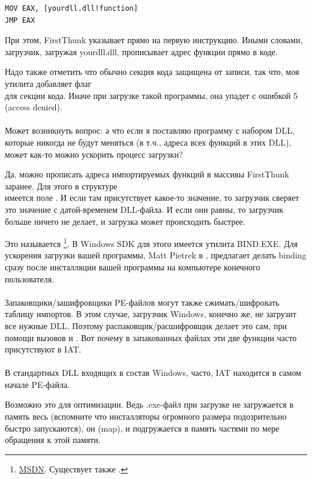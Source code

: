 \begin{lstlisting}
MOV EAX, [yourdll.dll!function]
JMP EAX
\end{lstlisting}

При этом, FirstThunk указывает прямо на первую инструкцию.
Иными словами, загрузчик, загружая yourdll.dll, прописывает адрес функции  прямо в коде.

Надо также отметить что обычно секция кода защищена от записи, так что, моя утилита добавляет флаг \\
для секции кода. Иначе при загрузке такой программы, она упадет с ошибкой 5 (access denied). \\
\\
Может возникнуть вопрос: а что если я поставляю программу с набором DLL,
которые никогда не будут меняться (в т.ч., адреса всех функций в этих DLL), может как-то можно ускорить процесс загрузки?

Да, можно прописать адреса импортируемых функций в массивы FirstThunk заранее.
Для этого в структуре \\
 имеется поле .
И если там присутствует какое-то значение, то загрузчик сверяет это значение с датой-временем DLL-файла.
И если они равны, то загрузчик больше ничего не делает, и загрузка может происходить быстрее.

Это называется 
\footnote{\href{http://go.yurichev.com/17050}{MSDN}.
Существует также .}.
В Windows SDK для этого имеется утилита BIND.EXE.
Для ускорения загрузки вашей программы, 
Matt Pietrek в \cite{Pietrek1}, предлагает делать binding сразу после инсталляции
вашей программы на компьютере конечного пользователя. \\
\\
Запаковщики/зашифровщики PE-файлов могут также сжимать/шифровать таблицу импортов.
В этом случае, загрузчик Windows, конечно же, не загрузит все нужные DLL.
Поэтому распаковщик/расшифровщик делает это сам, при помощи вызовов  и .
Вот почему в запакованных файлах эти две функции часто присутствуют в \ac{IAT}. \\
\\
В стандартных DLL входящих в состав Windows, часто, \ac{IAT} находится в самом начале PE-файла.

Возможно это для оптимизации.
Ведь .exe-файл при загрузке не загружается в память весь 
(вспомните что инсталляторы огромного размера подозрительно быстро запускаются), он  (map), 
и подгружается в память частями по мере обращения к этой памяти.

